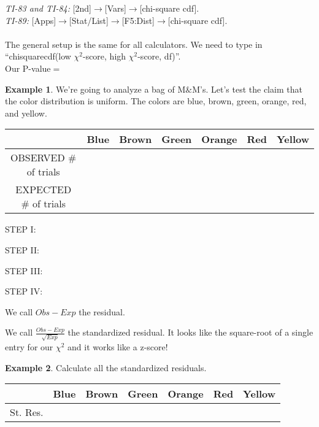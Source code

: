 \documentclass[12pt]{amsart}
\theoremstyle{definition}
\newtheorem{ex}{Example}
\begin{document}
\emph{TI-83 and TI-84:} [2nd]$\rightarrow$[Vars]$\rightarrow$[chi-square cdf].\\
\emph{TI-89:} [Apps]$\rightarrow$[Stat/List]$\rightarrow$[F5:Dist]$\rightarrow$[chi-square cdf].\\
~\\
The general setup is the same for all calculators. We need to type in ``chisquarecdf(low $\chi^2$-score, high $\chi^2$-score, df)''.\\
Our P-value$=$\underline{\hspace{5in}}
\newpage
\begin{ex} We're going to analyze a bag of M$\&$M's. Let's test the claim that the color distribution is uniform. The colors are blue, brown, green, orange, red, and yellow.
\end{ex}
\begin{center}
\begin{tabular}{c|c|c|c|c|c|c}
 & Blue& Brown& Green& Orange& Red& Yellow\\\hline
OBSERVED $\#$ of trials &  &  &  &  &  & \\ \hline
EXPECTED $\#$ of trials & & & & & &
\end{tabular}
\end{center}
\vspace{0.1in}

\noindent STEP I:
\vspace{0.2in}

\noindent STEP II:
\vfill

\noindent STEP III:
\vfill

\noindent STEP IV:
\vspace{0.5in}

\begin{framed}
 We call $Obs-Exp$ the residual.
 
 We call $\frac{Obs-Exp}{\sqrt{Exp}}$ the standardized residual. It looks like the square-root of a single entry for our $\chi^2$ and it works like a z-score!
\end{framed}

\begin{ex} Calculate all the standardized residuals.
\end{ex}
\begin{center}
\begin{tabular}{c|c|c|c|c|c|c}
 & Blue& Brown& Green& Orange& Red& Yellow\\\hline
St. Res. &  &  &  &  &  & \\
\end{tabular}
\end{center}
\vspace{0.3in}
\end{document}

